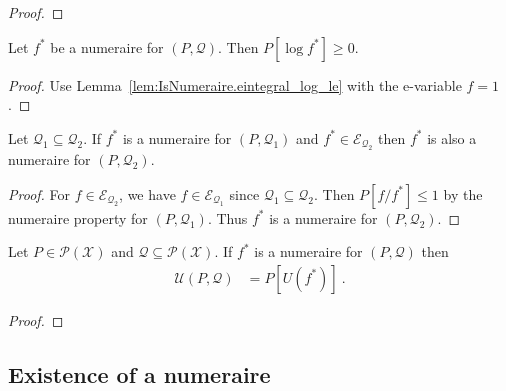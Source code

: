 \begin{proof}\leanok

\end{proof}


\begin{lemma}\label{lem:IsNumeraire.eintegral_log_nonneg}
  \leanok
Let $f^*$ be a numeraire for $(P, \mathcal{Q})$.
Then $P[\log f^*] \ge 0$.
\end{lemma}

\begin{proof}\leanok
Use Lemma~\ref{lem:IsNumeraire.eintegral_log_le} with the e-variable $f = 1$.
\end{proof}


\begin{lemma}\label{lem:numeraire_mono}
Let $\mathcal{Q}_1 \subseteq \mathcal{Q}_2$. If $f^*$ is a numeraire for $(P, \mathcal{Q}_1)$ and $f^* \in \mathcal{E}_{\mathcal{Q}_2}$ then $f^*$ is also a numeraire for $(P, \mathcal{Q}_2)$.
\end{lemma}

\begin{proof}
For $f \in \mathcal{E}_{\mathcal{Q}_2}$, we have $f \in \mathcal{E}_{\mathcal{Q}_1}$ since $\mathcal{Q}_1 \subseteq \mathcal{Q}_2$.
Then $P\left[f/f^*\right] \le 1$ by the numeraire property for $(P, \mathcal{Q}_1)$.
Thus $f^*$ is a numeraire for $(P, \mathcal{Q}_2)$.
\end{proof}


\begin{lemma}\label{lem:maxUtility_eq_integral}
  \leanok
Let $P \in \mathcal{P}(\mathcal{X})$ and $\mathcal{Q} \subseteq \mathcal{P}(\mathcal{X})$.
If $f^*$ is a numeraire for $(P, \mathcal{Q})$ then
\begin{align*}
  \mathcal{U}(P, \mathcal{Q})
  &= P[U(f^*)]
  \: .
\end{align*}
\end{lemma}

\begin{proof}\leanok

\end{proof}



\subsection{Existence of a numeraire}


